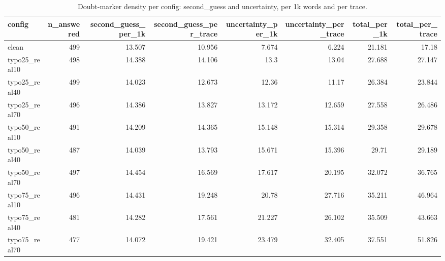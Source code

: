 \documentclass[11pt]{article}
\begin{document}
\begin{table}[H]
\centering
\caption{Doubt-marker density per config: second\_guess and uncertainty, per 1k words and per trace.}
\small
\begin{adjustbox}{max width=\textwidth}
\begin{tabular}{lrrrrrrr}
\toprule
\textbf{config} & \textbf{n\_answered} & \textbf{second\_guess\_per\_1k} & \textbf{second\_guess\_per\_trace} & \textbf{uncertainty\_per\_1k} & \textbf{uncertainty\_per\_trace} & \textbf{total\_per\_1k} & \textbf{total\_per\_trace} \\
\midrule
clean & 499 & 13.507 & 10.956 & 7.674 & 6.224 & 21.181 & 17.18 \\
typo25\_real10 & 498 & 14.388 & 14.106 & 13.3 & 13.04 & 27.688 & 27.147 \\
typo25\_real40 & 499 & 14.023 & 12.673 & 12.36 & 11.17 & 26.384 & 23.844 \\
typo25\_real70 & 496 & 14.386 & 13.827 & 13.172 & 12.659 & 27.558 & 26.486 \\
typo50\_real10 & 491 & 14.209 & 14.365 & 15.148 & 15.314 & 29.358 & 29.678 \\
typo50\_real40 & 487 & 14.039 & 13.793 & 15.671 & 15.396 & 29.71 & 29.189 \\
typo50\_real70 & 497 & 14.454 & 16.569 & 17.617 & 20.195 & 32.072 & 36.765 \\
typo75\_real10 & 496 & 14.431 & 19.248 & 20.78 & 27.716 & 35.211 & 46.964 \\
typo75\_real40 & 481 & 14.282 & 17.561 & 21.227 & 26.102 & 35.509 & 43.663 \\
typo75\_real70 & 477 & 14.072 & 19.421 & 23.479 & 32.405 & 37.551 & 51.826 \\
\bottomrule
\end{tabular}
\end{adjustbox}
\end{table}
\end{document}
